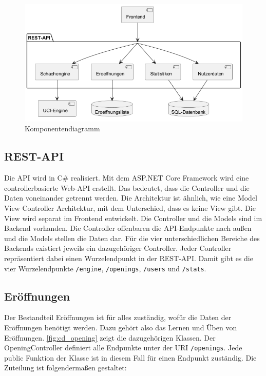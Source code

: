 \begin{figure}[h]
    \includegraphics[width=\linewidth]{images/diagrams/components.png}
    \caption{Komponentendiagramm}
    \label{fig:components}
\end{figure}

\subsection{REST-API}
Die API wird in C\# realisiert. Mit dem ASP.NET Core Framework wird eine controllerbasierte Web-API erstellt. Das bedeutet, dass die Controller und die Daten voneinander getrennt werden. Die Architektur ist ähnlich, wie eine Model View Controller Architektur, mit dem Unterschied, dass es keine View gibt. Die View wird separat im Frontend entwickelt. Die Controller und die Models sind im Backend vorhanden. Die Controller offenbaren die API-Endpunkte nach außen und die Models stellen die Daten dar. Für die vier unterschiedlichen Bereiche des Backends existiert jeweils ein dazugehöriger Controller. Jeder Controller repräsentiert dabei einen Wurzelendpunkt in der REST-API. Damit gibt es die vier Wurzelendpunkte \lstinline{/engine}, \lstinline{/openings}, \lstinline{/users} und \lstinline{/stats}.

\subsection{Eröffnungen}
Der Bestandteil Eröffnungen ist für alles zuständig, wofür die Daten der Eröffnungen benötigt werden. Dazu gehört also das Lernen und Üben von Eröffnungen. \autoref{fig:cd_opening} zeigt die dazugehörigen Klassen. Der OpeningController definiert alle Endpunkte unter der URI \lstinline{/openings}. Jede public Funktion der Klasse ist in diesem Fall für einen Endpunkt zuständig. Die Zuteilung ist folgendermaßen gestaltet:

